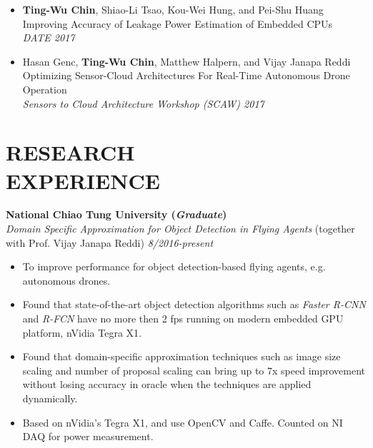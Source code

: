 \documentclass[margin, 9pt]{res} %
\begin{document}
\begin{resume}
\begin{itemize}[leftmargin=*] \itemsep 0pt
	\item \textbf{Ting-Wu Chin}, Shiao-Li Tsao, Kou-Wei Hung, and Pei-Shu Huang\\[2pt]
          Improving Accuracy of Leakage Power Estimation of Embedded CPUs\\
          \textit{DATE 2017}
	\item Hasan Genc, \textbf{Ting-Wu Chin}, Matthew Halpern, and Vijay Janapa Reddi\\[2pt]
          Optimizing Sensor-Cloud Architectures For Real-Time Autonomous Drone Operation\\
          \textit{Sensors to Cloud Architecture Workshop (SCAW) 2017}
\end{itemize}


\section{RESEARCH\\ EXPERIENCE}

{\large\textbf{National Chiao Tung University (\textit{Graduate})}}\\


{\large\textit{Domain Specific Approximation for Object Detection in Flying Agents} (together with Prof. Vijay Janapa Reddi)} \hfill\textit{8/2016-present}\\
\vspace*{-7pt}
\begin{itemize}[leftmargin=*] \itemsep -3pt
\vspace*{-5pt}
  \item To improve performance for object detection-based flying agents, e.g.
  autonomous drones.
  \item Found that state-of-the-art object detection algorithms such as
  \textit{Faster R-CNN} and \textit{R-FCN} have no more then 2 fps running on
  modern embedded GPU platform, nVidia Tegra X1.
	\item Found that domain-specific approximation techniques such as image size
  scaling and number of proposal scaling can bring up to 7x speed improvement
  without losing accuracy in oracle when the techniques are applied dynamically.
  \item Based on nVidia's Tegra X1, and use OpenCV and Caffe. Counted on NI DAQ
  for power measurement.
\end{itemize}
\vspace*{-7pt}


\end{resume}
\end{document}
